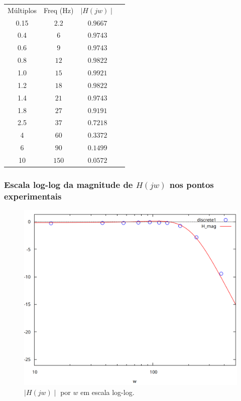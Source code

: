 \documentclass[12pt,twoside, a4paper, twocolumn]{article}
\begin{document}
\begin{center}
    \begin{tabular}{ |c|c|c|c| }
        \hline
        Múltiplos & Freq (Hz) & $\mid H(jw) \mid$ \\
        0.15      & $2.2$     & $0.9667$          \\
        0.4       & $6$       & $0.9743$          \\
        0.6       & $9$       & $0.9743$          \\
        0.8       & $12$      & $0.9822$          \\
        1.0       & $15$      & $0.9921$          \\
        1.2       & $18$      & $0.9822$          \\
        1.4       & $21$      & $0.9743$          \\
        1.8       & $27$      & $0.9191$          \\
        2.5       & $37$      & $0.7218$          \\
        4         & $60$      & $0.3372$          \\
        6         & $90$      & $0.1499$          \\
        10        & $150$     & $0.0572$          \\
        \hline
    \end{tabular}
\end{center}
\pagebreak


\subsubsection*{Escala log-log da magnitude de $H(jw)$ nos pontos experimentais}


\begin{figure}[h]
    \centering
    \includegraphics[width=1\columnwidth]{images/H2loglog.png}
    \caption{ $\mid H(jw) \mid$ por $w$ em escala log-log.}
\end{figure}
\end{document}
